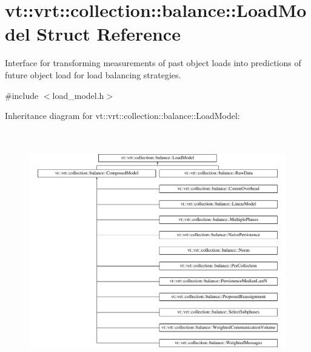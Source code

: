 \hypertarget{structvt_1_1vrt_1_1collection_1_1balance_1_1_load_model}{}\section{vt\+:\+:vrt\+:\+:collection\+:\+:balance\+:\+:Load\+Model Struct Reference}
\label{structvt_1_1vrt_1_1collection_1_1balance_1_1_load_model}


Interface for transforming measurements of past object loads into predictions of future object load for load balancing strategies.  




{\ttfamily \#include $<$load\+\_\+model.\+h$>$}

Inheritance diagram for vt\+:\+:vrt\+:\+:collection\+:\+:balance\+:\+:Load\+Model\+:\begin{figure}[H]
\begin{center}
\leavevmode
\includegraphics[height=10.489914cm]{structvt_1_1vrt_1_1collection_1_1balance_1_1_load_model}
\end{center}
\end{figure}
